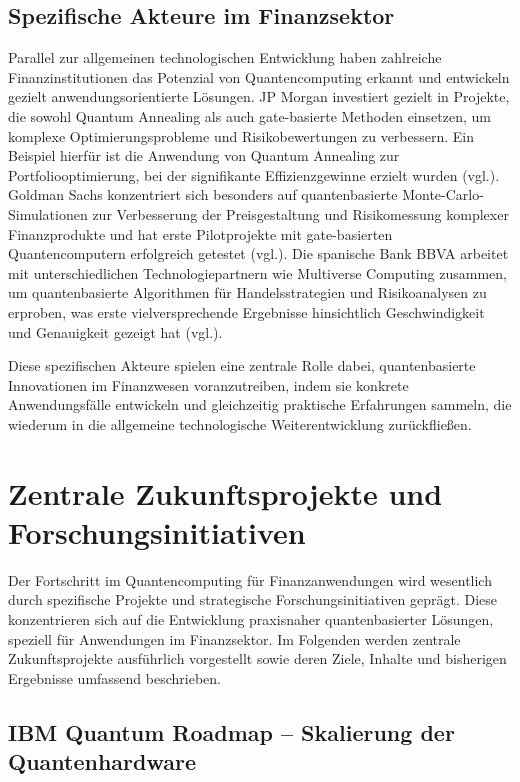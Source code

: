 \subsection{Spezifische Akteure im Finanzsektor}

Parallel zur allgemeinen technologischen Entwicklung haben zahlreiche Finanzinstitutionen das Potenzial von Quantencomputing erkannt und entwickeln gezielt anwendungsorientierte Lösungen. JP Morgan investiert gezielt in Projekte, die sowohl Quantum Annealing als auch gate-basierte Methoden einsetzen, um komplexe Optimierungsprobleme und Risikobewertungen zu verbessern. Ein Beispiel hierfür ist die Anwendung von Quantum Annealing zur Portfoliooptimierung, bei der signifikante Effizienzgewinne erzielt wurden (vgl.\cite{Herman et al., 2022}). Goldman Sachs konzentriert sich besonders auf quantenbasierte Monte-Carlo-Simulationen zur Verbesserung der Preisgestaltung und Risikomessung komplexer Finanzprodukte und hat erste Pilotprojekte mit gate-basierten Quantencomputern erfolgreich getestet (vgl.\cite{egger_quantum_2020}). Die spanische Bank BBVA arbeitet mit unterschiedlichen Technologiepartnern wie Multiverse Computing zusammen, um quantenbasierte Algorithmen für Handelsstrategien und Risikoanalysen zu erproben, was erste vielversprechende Ergebnisse hinsichtlich Geschwindigkeit und Genauigkeit gezeigt hat (vgl.\cite{orus_quantum_2019}).

Diese spezifischen Akteure spielen eine zentrale Rolle dabei, quantenbasierte Innovationen im Finanzwesen voranzutreiben, indem sie konkrete Anwendungsfälle entwickeln und gleichzeitig praktische Erfahrungen sammeln, die wiederum in die allgemeine technologische Weiterentwicklung zurückfließen.


\section{Zentrale Zukunftsprojekte und Forschungsinitiativen}

Der Fortschritt im Quantencomputing für Finanzanwendungen wird wesentlich durch spezifische Projekte und strategische Forschungsinitiativen geprägt. Diese konzentrieren sich auf die Entwicklung praxisnaher quantenbasierter Lösungen, speziell für Anwendungen im Finanzsektor. Im Folgenden werden zentrale Zukunftsprojekte ausführlich vorgestellt sowie deren Ziele, Inhalte und bisherigen Ergebnisse umfassend beschrieben.

\subsection{IBM Quantum Roadmap – Skalierung der Quantenhardware}


